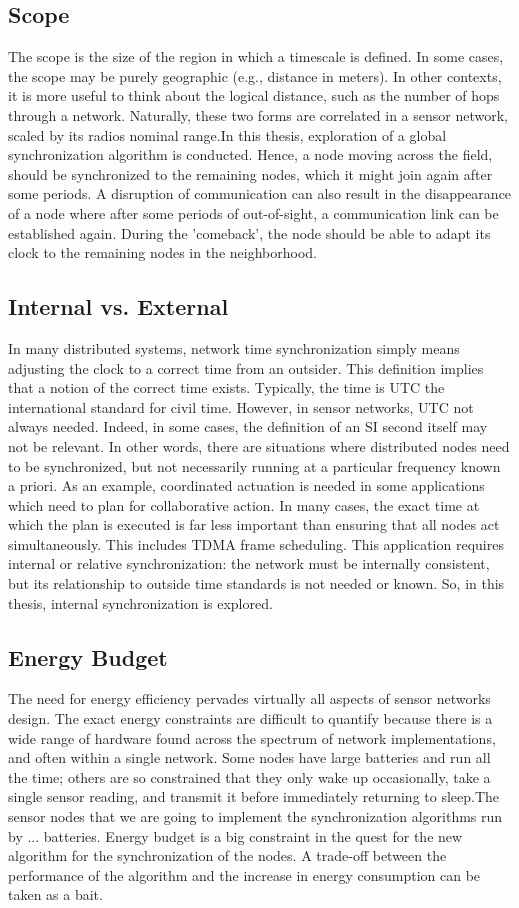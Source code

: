 \documentclass[a4paper,8pt]{report}
\begin{document}
\subsection{Scope}
The scope is the size of the region in which a timescale is defined.
In some cases, the scope may be purely geographic (e.g., distance in
meters). In other contexts, it is more useful to think about the
logical distance, such as the number of hops through a network.
Naturally, these two forms are correlated in a sensor network,
scaled by its radios nominal range.\newline In this thesis,
exploration of a global synchronization algorithm is conducted.
Hence, a node moving across the field, should be synchronized to the
remaining nodes, which it might join again after some periods. A
disruption of communication can also result in the disappearance of
a node where after some periods of out-of-sight, a communication
link can be established again. During the 'comeback', the node
should be able to adapt its clock to the remaining nodes in the
neighborhood.
\subsection{Internal vs. External}
In many distributed systems, network time synchronization simply
means adjusting the clock to a correct time from an outsider. This
definition implies that a notion of the correct time exists.
Typically, the time is UTC the international standard for civil
time. However, in sensor networks, UTC not always needed. Indeed, in
some cases, the definition of an SI second itself may not be
relevant. In other words, there are situations where distributed
nodes need to be synchronized, but not necessarily running at a
particular frequency known a priori. As an example, coordinated
actuation is needed in some applications which need to plan for
collaborative action. In many cases, the exact time at which the
plan is executed is far less important than ensuring that all nodes
act simultaneously. This includes TDMA frame scheduling. This
application requires internal or relative synchronization: the
network must be internally consistent, but its relationship to
outside time standards is not needed or known. So, in this thesis,
internal synchronization is explored.
\subsection{Energy Budget}
The need for energy efficiency pervades virtually all aspects of
sensor networks design. The exact energy constraints are difficult
to quantify because there is a wide range of hardware found across
the spectrum of network implementations, and often within a single
network. Some nodes have large batteries and run all the time;
others are so constrained that they only wake up occasionally, take
a single sensor reading, and transmit it before immediately
returning to sleep.\newline The sensor nodes that we are going to
implement the synchronization algorithms run by ... batteries.
Energy budget is a big constraint in the quest for the new algorithm
for the synchronization of the nodes. A trade-off between the
performance of the algorithm and the increase in energy consumption
can be taken as a bait.
\end{document}
